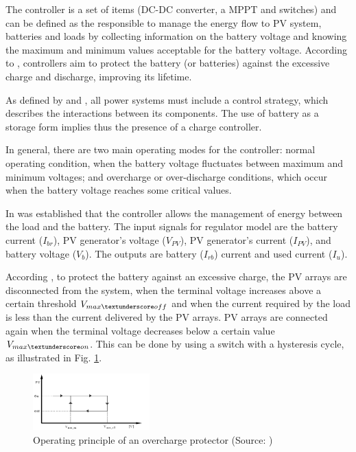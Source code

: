 \documentclass[journal]{IEEEtran}
\begin{document}
The controller is a set of items (DC-DC converter, a MPPT and switches) and can be defined as the responsible to manage the energy flow to PV system, batteries and loads by collecting information on the battery voltage and knowing the maximum and minimum values acceptable for the battery voltage. According to \cite{Pinho}, controllers aim to protect the battery (or batteries) against the excessive charge and discharge, improving its lifetime. 

As defined by \cite{Hansen} and \cite{Mellit}, all power systems must include a control strategy, which describes the interactions between its components. The use of battery as a storage form implies thus the presence of a charge controller. 

In general, there are two main operating modes for the controller: normal operating condition, when the battery voltage fluctuates between maximum and minimum voltages; and overcharge or over-discharge conditions, which occur when the battery voltage reaches some critical values. 

In \cite{Mellit} was established that the controller allows the management of energy between the load and the battery. The input signals for regulator model are the battery current ($ I_{br} $), PV generator's voltage ($ V_{PV} $), PV generator's current ($ I_{PV} $), and battery voltage ($ V_{b} $). The outputs are battery ($ I_{rb} $) current and used current ($ I_{u} $). 

According \cite{Hansen}, to protect the battery against an excessive charge, the PV arrays are disconnected from the system, when the terminal voltage increases above a certain threshold $ V_{max \textunderscore off} $ and when the current required by the load is less than the current delivered by the PV arrays. PV arrays are connected again when the terminal voltage decreases below a certain value $ V_{max \textunderscore on} $. This can be done by using a switch with a hysteresis cycle, as illustrated in Fig. \ref{fig:controllerover}. 

\begin{figure}[h]
\includegraphics[width=0.4\textwidth]{controllerover}
\centering
\caption{Operating principle of an overcharge protector (Source: \cite{Hansen})}
\label{fig:controllerover}
\end{figure}
\end{document}
